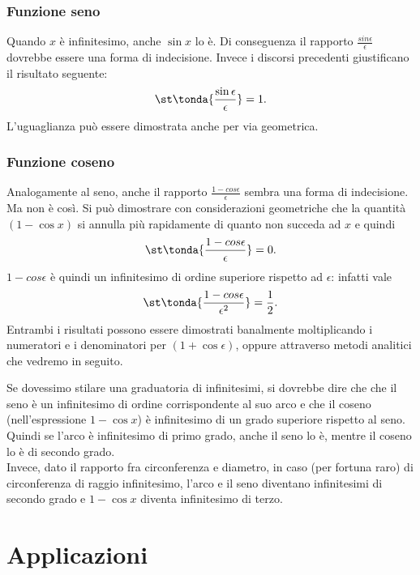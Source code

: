 \subsubsection{Funzione seno}
\label{subsubsec:insnum_fseno}
Quando $x$ è infinitesimo, anche $\sin x$ lo è. Di conseguenza il rapporto
$\frac{sin\epsilon}{\epsilon}$ dovrebbe essere una forma di indecisione. 
Invece i discorsi precedenti giustificano il risultato seguente:
\[
 \st\tonda{\frac{\sin \epsilon}{\epsilon}}=1.
\]
L'uguaglianza può essere dimostrata anche per via geometrica.

\subsubsection{Funzione coseno}
\label{subsubsec:insnum_fcoseno}
Analogamente al seno, anche il rapporto \(\frac{1-cos \epsilon}{\epsilon}\)
sembra una forma di indecisione. Ma non è così. 
Si può dimostrare con considerazioni geometriche che 
la quantità $(1-\cos x)$ si annulla più rapidamente di quanto non succeda ad 
$x$ e quindi
\[
 \st\tonda{\frac{1-cos \epsilon}{\epsilon}}=0.
\]
$1-cos \epsilon$ è quindi un infinitesimo di ordine superiore rispetto ad 
$\epsilon$: infatti vale
\[
 \st\tonda{\frac{1-cos \epsilon}{\epsilon^2}}=\frac{1}{2}.
\]
Entrambi i risultati possono essere dimostrati banalmente moltiplicando i 
numeratori e i denominatori per $(1+\cos \epsilon)$, oppure attraverso 
metodi analitici che vedremo in seguito.

\begin{osservazione}
Se dovessimo stilare una graduatoria di infinitesimi, si dovrebbe dire che 
che il seno è un infinitesimo di ordine corrispondente al suo arco e che il coseno
(nell'espressione $1-\cos x$) è infinitesimo di un grado superiore rispetto al seno.
Quindi se l'arco è infinitesimo di primo grado, anche il seno lo è, mentre
il coseno lo è di secondo grado.\\
Invece, dato il rapporto fra circonferenza e diametro, in caso (per fortuna raro)
di circonferenza di raggio infinitesimo, l'arco e il seno diventano infinitesimi
di secondo grado e $1-\cos x$ diventa infinitesimo di terzo.
\end{osservazione}



\section{Applicazioni}
\label{sec:insnum_applicazioni}

